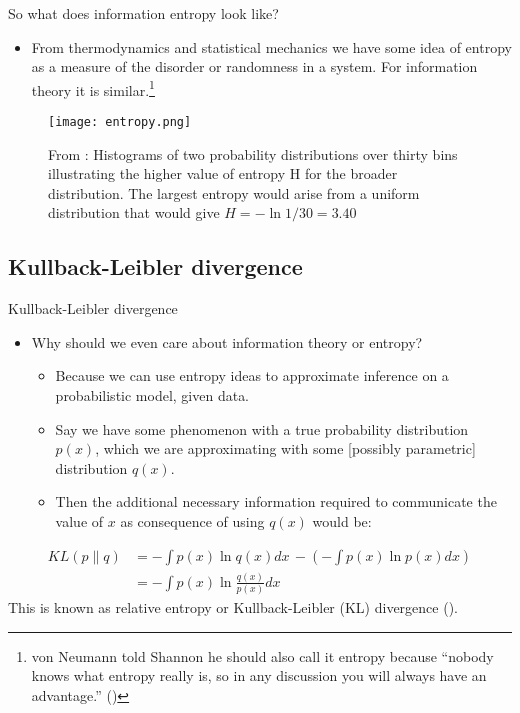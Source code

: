 \documentclass{beamer}
\begin{document}
\begin{frame}{So what does information entropy look like?}
\begin{itemize}
\item From thermodynamics and statistical mechanics we have some idea of entropy as a measure of the disorder or randomness in a system. For information theory it is similar.\footnote{von Neumann told Shannon he should also call it entropy because ``nobody knows what entropy really is, so in any discussion you will always have an advantage.'' (\cite{bishop})}
\end{itemize}

\begin{figure}
\texttt{[image: entropy.png]}
\caption{\label{fig:entropy}From \cite{bishop}: Histograms of two probability distributions over thirty bins illustrating the higher value of entropy H for the broader distribution. The largest entropy would arise from a uniform distribution that would give $H = -\ln 1/30 = 3.40$}
\end{figure}

\end{frame}


\subsection{Kullback-Leibler divergence}
\begin{frame}{Kullback-Leibler divergence}
\begin{itemize}
\item Why should we even care about information theory or entropy?
  \begin{itemize}
  \item Because we can use entropy ideas to approximate inference on a probabilistic model, given data.
  \item Say we have some phenomenon with a true probability distribution $p(x)$, which we are approximating with some [possibly parametric] distribution $q(x)$.
  \item Then the additional necessary information required to communicate the value of $x$ as consequence of using $q(x)$ would be:
  \end{itemize}
\end{itemize}
\begin{equation}
  \begin{split}
    KL(p\|q) & = - \int p(x) \ln q(x) dx \, - \left(-\int p(x) \ln p(x) dx \right) \\
    & =  - \int p(x) \ln  \frac{q(x)}{p(x)} dx
  \end{split}
\end{equation}
  This is known as relative entropy or  Kullback-Leibler (KL) divergence (\cite{kullback1951}).
\end{frame}
\end{document}
